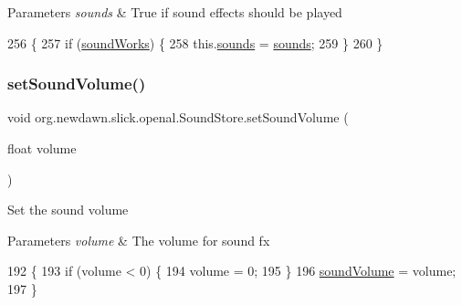 \begin{DoxyParams}{Parameters}
{\em sounds} & True if sound effects should be played \\
\hline
\end{DoxyParams}

\begin{DoxyCode}
256                                             \{
257         \textcolor{keywordflow}{if} (\mbox{\hyperlink{classorg_1_1newdawn_1_1slick_1_1openal_1_1_sound_store_ae563e9c1a01e333dc2350f1450f451fd}{soundWorks}}) \{
258             this.\mbox{\hyperlink{classorg_1_1newdawn_1_1slick_1_1openal_1_1_sound_store_a64f1d8fb16c0b816d20abf0e695a85ec}{sounds}} = \mbox{\hyperlink{classorg_1_1newdawn_1_1slick_1_1openal_1_1_sound_store_a64f1d8fb16c0b816d20abf0e695a85ec}{sounds}};
259         \}
260     \}
\end{DoxyCode}
\mbox{\label{classorg_1_1newdawn_1_1slick_1_1openal_1_1_sound_store_a3dc73a371a758af845cff776986072c0}} 
\subsubsection{\texorpdfstring{set\+Sound\+Volume()}{setSoundVolume()}}
{\footnotesize\ttfamily void org.\+newdawn.\+slick.\+openal.\+Sound\+Store.\+set\+Sound\+Volume (\begin{DoxyParamCaption}\item[{float}]{volume }\end{DoxyParamCaption})\hspace{0.3cm}{\ttfamily [inline]}}

Set the sound volume


\begin{DoxyParams}{Parameters}
{\em volume} & The volume for sound fx \\
\hline
\end{DoxyParams}

\begin{DoxyCode}
192                                              \{
193         \textcolor{keywordflow}{if} (volume < 0) \{
194             volume = 0;
195         \}
196         \mbox{\hyperlink{classorg_1_1newdawn_1_1slick_1_1openal_1_1_sound_store_af4d5ad2dc31f33a212d52ff54fcfe4fd}{soundVolume}} = volume;
197     \}
\end{DoxyCode}
\mbox{\label{classorg_1_1newdawn_1_1slick_1_1openal_1_1_sound_store_ab22cf64fd9231d5b4455bf31d7893f85}} 
